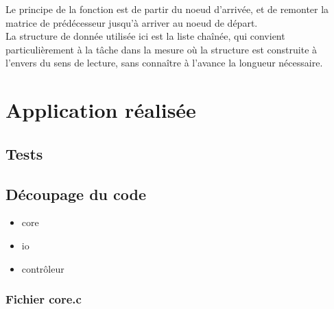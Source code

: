 \documentclass[a4paper,12pt,final] {article}
\begin{document}
Le principe de la fonction est de partir du noeud d'arrivée, et de remonter la matrice de prédécesseur jusqu'à arriver au noeud de départ. \\

La structure de donnée utilisée ici est la liste chaînée, qui convient particulièrement à la tâche dans la mesure où la structure est construite à l'envers du sens de lecture, sans connaître à l'avance la longueur nécessaire.\\

\newpage
\section{Application réalisée}
\subsection{Tests}
\subsection{Découpage du code}

\begin{itemize}
\item{core}
\item{io}
\item{contrôleur}
\end{itemize}


\subsubsection{Fichier core.c}

\end{document}
